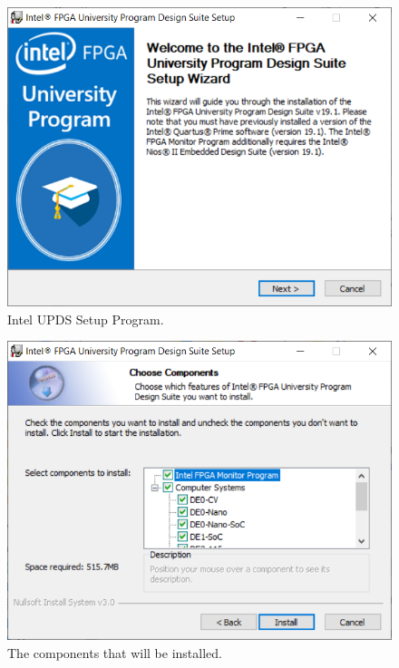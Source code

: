 \documentclass[11pt, twoside, pdftex]{article}
\begin{document}
\begin{enumerate}
\begin{figure}[H]
   	\begin{center}
           \includegraphics[scale=0.7]{screenshots/figure1.png}
   	\end{center}
      \caption{Intel UPDS Setup Program.}
			\label{fig:1}
\end{figure}

\begin{figure}[H]
   	\begin{center}
            \includegraphics[scale=0.7]{screenshots/figure2.png}
   	\end{center}
      \caption{The components that will be installed.}
			\label{fig:2}
\end{figure}
~\\


\end{enumerate}
\end{document}
